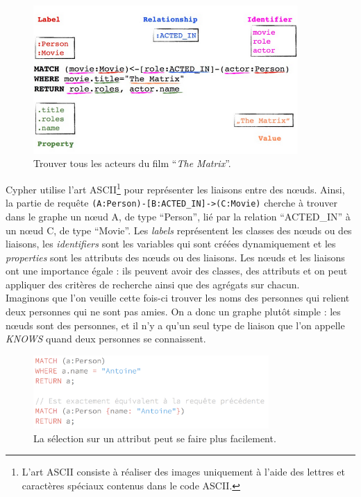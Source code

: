 		\begin{figure}[H]
			\centering
			\includegraphics[width=0.9\textwidth]{images/requeteNeo4j.png}
			\caption{Trouver tous les acteurs du film \enquote{\textit{The Matrix}}.\cite{grapheNeo4j}}
			\label{requeteNeo4j}
		\end{figure}

		Cypher utilise l'art ASCII\footnote{L'art ASCII consiste à réaliser des images uniquement à l'aide des lettres et caractères spéciaux contenus dans le code ASCII.\cite{Wikipedia_artASCII}} pour représenter les liaisons entre des nœuds. Ainsi, la partie de requête \texttt{(A:Person)-[B:ACTED\_IN]->(C:Movie)} cherche à trouver dans le graphe un nœud A, de type \enquote{Person}, lié par la relation \enquote{ACTED\_IN} à un nœud C, de type \enquote{Movie}. Les \textit{labels} représentent les classes des nœuds ou des liaisons, les \textit{identifiers} sont les variables qui sont créées dynamiquement et les \textit{properties} sont les attributs des nœuds ou des liaisons. Les nœuds et les liaisons ont une importance égale : ils peuvent avoir des classes, des attributs et on peut appliquer des critères de recherche ainsi que des agrégats sur chacun.\\

		Imaginons que l'on veuille cette fois-ci trouver les noms des personnes qui relient deux personnes qui ne sont pas amies. On a donc un graphe plutôt simple : les nœuds sont des personnes, et il n'y a qu'un seul type de liaison que l'on appelle \textit{KNOWS} quand deux personnes se connaissent.

		\begin{figure}[H]
			\centering
			\includegraphics[width=0.8\textwidth]{images/shortSelect.png}
			\caption{La sélection sur un attribut peut se faire plus facilement.}
		\end{figure}

